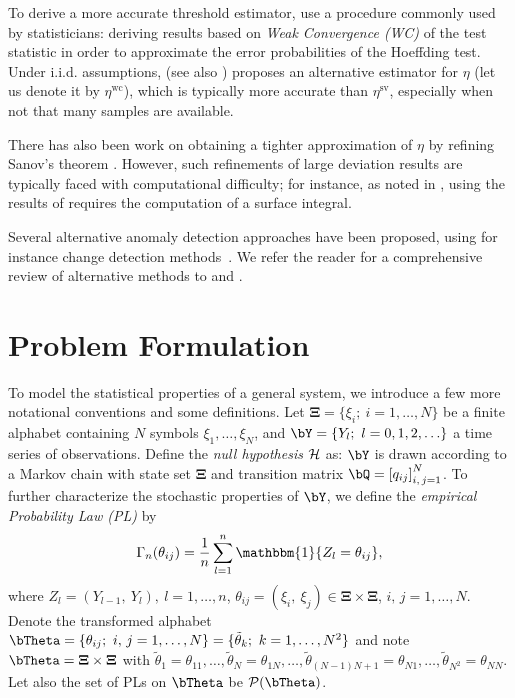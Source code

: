 \documentclass[10pt, twocolumn]{IEEEtran}
\begin{document}
To derive a more accurate threshold estimator,
\cite{TIT13,unnikrishnan2011universal} use a procedure commonly used by
statisticians: deriving results based on {\em Weak Convergence (WC)} of
the test statistic in order to approximate the error probabilities of
the Hoeffding test. Under i.i.d. assumptions, \cite{TIT13} (see also
\cite{unnikrishnan2011universal,wilks1938large}) proposes an alternative
estimator for $\eta$ (let us denote it by $\eta^{\text{wc}}$), which is
typically more accurate than $\eta^{\text{sv}}$, especially when not
that many samples are available.
 
There has also been work on obtaining a {tighter} approximation of
$\eta$ by refining Sanov's theorem \cite{iltis1995sharp}. However, such
refinements of large deviation results are typically faced with
computational difficulty; for instance, as noted in
\cite{unnikrishnan2011universal}, using the results of
\cite{iltis1995sharp} requires the computation of a surface integral.

Several alternative anomaly detection approaches have been proposed,
using for instance change detection
methods~\cite{thottan2003anomaly}. We refer the reader for a
comprehensive review of alternative methods to \cite{thottan2003anomaly}
and \cite{pas-sma-ton-09}.



\section{Problem Formulation} \label{sec:prob}

To model the statistical properties of a general system, we introduce a
few more notational conventions and some definitions. Let
$\boldsymbol{\Xi} = \{{\xi _i}; ~ i = 1, \ldots, N\}$ be a finite
alphabet containing $N$ symbols $\xi_1,\ldots,\xi_N$, and $\bY = \{
{Y_l};~l = 0,1,2, \ldots \}$ a time series of observations.  Define the
\textit{null hypothesis} $\cal H$ as: $\bY$ is drawn according to a
Markov chain with state set $\boldsymbol{\Xi}$ and transition matrix
$\bQ = \left[ {{q_{ij}}} \right]_{i,\,j = 1}^N$.  To further
characterize the {stochastic} properties of $\bY$, we define the
\textit{empirical Probability Law (PL)} by
\begin{equation} {\Gamma _n}( {{\theta_{ij}}} ) =
  \frac{1}{n}\sum_{l = 1}^n \mathbbm{1} \{ Z_l =
          \theta_{ij} \}, \label{1}
\end{equation}
where ${Z_l} = ( {{Y_{l - 1}},~{Y_l}}), ~l=1,\ldots,n$, ${\theta_{ij}} =
( {{\xi _i},~{\xi _j}}) \in \boldsymbol{\Xi} \times \boldsymbol{\Xi}$,
$i,\,j = 1, \ldots ,N$. Denote the transformed alphabet
${\bTheta} = \{ {{\theta_{ij}}};~i,\,j = 1, \ldots, N \} = \{
{{{\tilde {\theta}}_k}}; ~k = 1, \ldots, N^2 \}$ and note
${\bTheta} = \boldsymbol{\Xi} \times \boldsymbol{\Xi}$ with
${{\tilde {\theta}}_1} = {\theta_{11}}, \ldots, {{\tilde {\theta}}_N} =
{\theta_{1N}}, \ldots, {{\tilde {\theta}}_{( {N - 1})N + 1}} =
{\theta_{N1}}, \ldots, {{\tilde {\theta}}_{{N^2}}} = {\theta_{NN}}$.
Let also the set of PLs on ${\bTheta}$ be
$\mathcal{P}({\bTheta})$.
\end{document}
